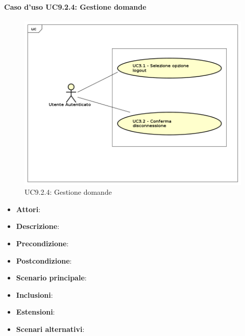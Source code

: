 		\paragraph{Caso d'uso UC9.2.4: Gestione domande}
		\label{UC9.2.4}
		\begin{figure}[h]
			\centering
		\includegraphics[scale=0.7,keepaspectratio]{UML/UC9.png}
			\caption{UC9.2.4: Gestione domande}
		\end{figure}
		\FloatBarrier
		\begin{itemize}
			\item \textbf{Attori}: 
			\item \textbf{Descrizione}: 
			\item \textbf{Precondizione}: 
			\item \textbf{Postcondizione}: 
			\item \textbf{Scenario principale}:
			\item \textbf{Inclusioni}:
			\item \textbf{Estensioni}:
			\item \textbf{Scenari alternativi}:
		\end{itemize}
		
